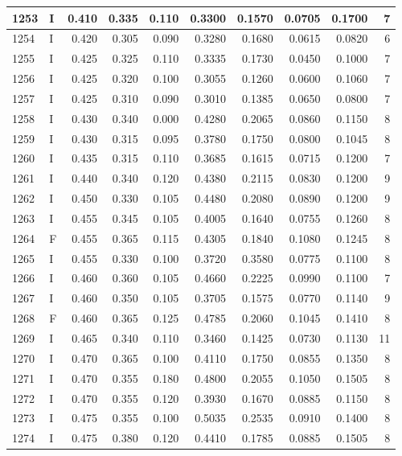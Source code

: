 \documentclass[9pt,twocolumn,twoside,]{pnas-new}
\begin{document}
\begin{tabular}{l|l|r|r|r|r|r|r|r|r}
\hline
1253 & I & 0.410 & 0.335 & 0.110 & 0.3300 & 0.1570 & 0.0705 & 0.1700 & 7\\
\hline
1254 & I & 0.420 & 0.305 & 0.090 & 0.3280 & 0.1680 & 0.0615 & 0.0820 & 6\\
\hline
1255 & I & 0.425 & 0.325 & 0.110 & 0.3335 & 0.1730 & 0.0450 & 0.1000 & 7\\
\hline
1256 & I & 0.425 & 0.320 & 0.100 & 0.3055 & 0.1260 & 0.0600 & 0.1060 & 7\\
\hline
1257 & I & 0.425 & 0.310 & 0.090 & 0.3010 & 0.1385 & 0.0650 & 0.0800 & 7\\
\hline
1258 & I & 0.430 & 0.340 & 0.000 & 0.4280 & 0.2065 & 0.0860 & 0.1150 & 8\\
\hline
1259 & I & 0.430 & 0.315 & 0.095 & 0.3780 & 0.1750 & 0.0800 & 0.1045 & 8\\
\hline
1260 & I & 0.435 & 0.315 & 0.110 & 0.3685 & 0.1615 & 0.0715 & 0.1200 & 7\\
\hline
1261 & I & 0.440 & 0.340 & 0.120 & 0.4380 & 0.2115 & 0.0830 & 0.1200 & 9\\
\hline
1262 & I & 0.450 & 0.330 & 0.105 & 0.4480 & 0.2080 & 0.0890 & 0.1200 & 9\\
\hline
1263 & I & 0.455 & 0.345 & 0.105 & 0.4005 & 0.1640 & 0.0755 & 0.1260 & 8\\
\hline
1264 & F & 0.455 & 0.365 & 0.115 & 0.4305 & 0.1840 & 0.1080 & 0.1245 & 8\\
\hline
1265 & I & 0.455 & 0.330 & 0.100 & 0.3720 & 0.3580 & 0.0775 & 0.1100 & 8\\
\hline
1266 & I & 0.460 & 0.360 & 0.105 & 0.4660 & 0.2225 & 0.0990 & 0.1100 & 7\\
\hline
1267 & I & 0.460 & 0.350 & 0.105 & 0.3705 & 0.1575 & 0.0770 & 0.1140 & 9\\
\hline
1268 & F & 0.460 & 0.365 & 0.125 & 0.4785 & 0.2060 & 0.1045 & 0.1410 & 8\\
\hline
1269 & I & 0.465 & 0.340 & 0.110 & 0.3460 & 0.1425 & 0.0730 & 0.1130 & 11\\
\hline
1270 & I & 0.470 & 0.365 & 0.100 & 0.4110 & 0.1750 & 0.0855 & 0.1350 & 8\\
\hline
1271 & I & 0.470 & 0.355 & 0.180 & 0.4800 & 0.2055 & 0.1050 & 0.1505 & 8\\
\hline
1272 & I & 0.470 & 0.355 & 0.120 & 0.3930 & 0.1670 & 0.0885 & 0.1150 & 8\\
\hline
1273 & I & 0.475 & 0.355 & 0.100 & 0.5035 & 0.2535 & 0.0910 & 0.1400 & 8\\
\hline
1274 & I & 0.475 & 0.380 & 0.120 & 0.4410 & 0.1785 & 0.0885 & 0.1505 & 8\\

\end{tabular}
\end{document}
